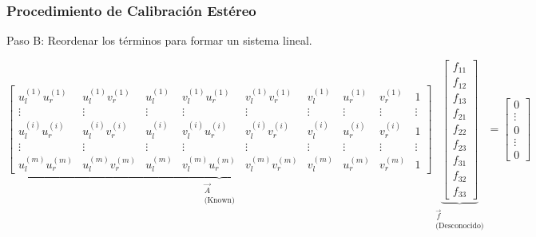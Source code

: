 \begin{frame}
    \frametitle{Procedimiento de Calibración Estéreo}
    
    Paso B: Reordenar los términos para formar un sistema lineal.

    \begin{equation*}
        \underbrace{
        \begin{bmatrix}
            u_l^{(1)}u_r^{(1)} & u_l^{(1)}v_r^{(1)} & u_l^{(1)} & v_l^{(1)}u_r^{(1)} & v_l^{(1)}v_r^{(1)} & v_l^{(1)} & u_r^{(1)} & v_r^{(1)} & 1\\
            \vdots & \vdots & \vdots & \vdots & \vdots & \vdots & \vdots & \vdots & \vdots\\
            u_l^{(i)}u_r^{(i)} & u_l^{(i)}v_r^{(i)} & u_l^{(i)} & v_l^{(i)}u_r^{(i)} & v_l^{(i)}v_r^{(i)} & v_l^{(i)} & u_r^{(i)} & v_r^{(i)} & 1\\
            \vdots & \vdots & \vdots & \vdots & \vdots & \vdots & \vdots & \vdots & \vdots\\
            u_l^{(m)}u_r^{(m)} & u_l^{(m)}v_r^{(m)} & u_l^{(m)} & v_l^{(m)}u_r^{(m)} & v_l^{(m)}v_r^{(m)} & v_l^{(m)} & u_r^{(m)} & v_r^{(m)} & 1
        \end{bmatrix}}_{\substack{\vec{A}\\ \text{(Known)}}}
        \underbrace{\begin{bmatrix}
            f_{11} \\ f_{12} \\ f_{13} \\ f_{21} \\ f_{22} \\ f_{23} \\ f_{31} \\ f_{32} \\ f_{33}
        \end{bmatrix}}_{\substack{\vec{f}\\ \text{(Desconocido)}}}
        =
        \begin{bmatrix}
            0 \\ \vdots \\ 0 \\ \vdots \\ 0
        \end{bmatrix}
    \end{equation*}

    \begin{center}
    \end{center}
    
\end{frame}

